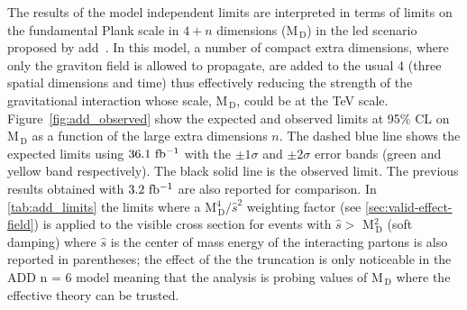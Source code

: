 The results of the model independent limits are interpreted in terms of limits
on the fundamental Plank scale in $4 + n$ dimensions (M$_\mathrm{\, D}$) in the
\gls{led} scenario proposed by \gls{add}~\cite{ADDPaper}. In this model, a
number of compact extra dimensions, where only the graviton field is allowed to
propagate, are added to the usual 4 (three spatial dimensions and time) thus
effectively reducing the strength of the gravitational interaction whose scale,
M$_\mathrm{\, D}$, could be at the TeV scale. Figure~\ref{fig:add_observed} show
the expected and observed limits at 95\% CL on M$_\mathrm{\, D}$ as a function
of the large extra dimensions $n$. The dashed blue line shows the expected
limits using $36.1~\mbox{fb$^{-1}$}$ with the $\pm 1 \sigma$ and $\pm 2 \sigma$ error bands
(green and yellow band respectively). The black solid line is the observed
limit. The previous results obtained with $3.2~\mbox{fb$^{-1}$}$ are also reported for
comparison. In \cref{tab:add_limits} the limits where a
M$^4_\mathrm{\, D} / \hat{s}^2$ weighting factor (see
\cref{sec:valid-effect-field}) is applied to the visible cross section for
events with $\hat{s} > $ M$^2_\mathrm{\, D}$ (soft damping) where $\hat{s}$ is
the center of mass energy of the interacting partons is also reported in
parentheses; the effect of the the truncation is only noticeable in the ADD n =
6 model meaning that the analysis is probing values of M$_\mathrm{\, D}$ where
the effective theory can be trusted.

